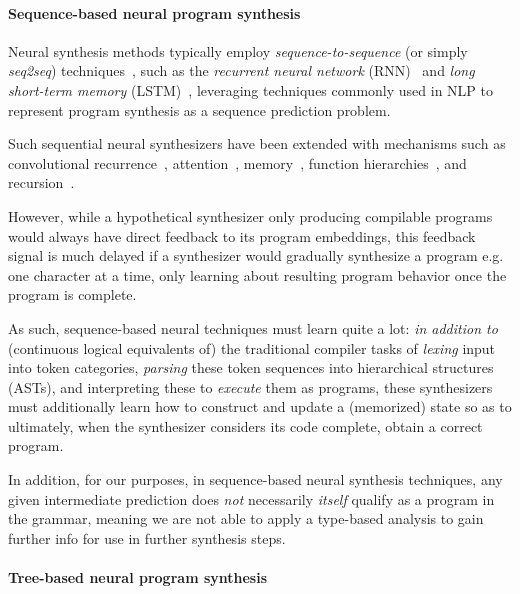 \documentclass{article}
\begin{document}
\paragraph{Sequence-based neural program synthesis} %

Neural synthesis methods typically employ \emph{sequence-to-sequence}
(or simply \emph{seq2seq}) techniques~\citep{npi,neuralmachinetranslation,alphanpi},
such as the \emph{recurrent neural network} (RNN)~\citep{backproprnn}
and \emph{long short-term memory} (LSTM)~\citep{lstm},
leveraging techniques commonly used in NLP
to represent program synthesis as a sequence prediction problem.%

Such sequential neural synthesizers have been extended with mechanisms such as
convolutional recurrence~\citep{neuralgpu},
attention~\citep{nmt,ptrnets,structuredattention},
memory~\citep{ntm,neuralram,neuralprogrammer,hierarchicalmemory},
function hierarchies~\citep{npi,npl},
and recursion~\citep{cai2017making}.

However, while a hypothetical synthesizer only producing compilable programs would always have direct feedback to its program embeddings,
this feedback signal is much delayed if a synthesizer would gradually synthesize a program e.g. one character at a time,
only learning about resulting program behavior once the program is complete.

As such, sequence-based neural techniques must learn quite a lot:
\emph{in addition to} (continuous logical equivalents of) the traditional compiler tasks of \emph{lexing} input into token categories,
\emph{parsing} these token sequences into hierarchical structures (ASTs),
and interpreting these to \emph{execute} them as programs,
these synthesizers must additionally learn how to construct and update a (memorized) state so as to ultimately,
when the synthesizer considers its code complete, obtain a correct program.

In addition, for our purposes, in sequence-based neural synthesis techniques,
any given intermediate prediction does \emph{not} necessarily \emph{itself} qualify as a program in the grammar,
meaning we are not able to apply a type-based analysis to gain further info for use in further synthesis steps.

\paragraph{Tree-based neural program synthesis}
\end{document}
